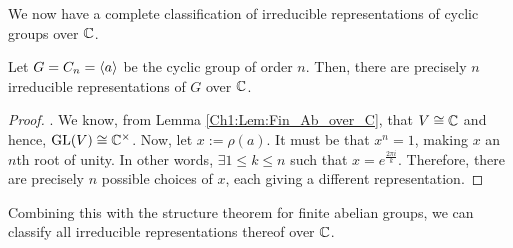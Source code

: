 We now have a complete classification of irreducible representations of cyclic groups over $\mathbb{C}$.

\begin{corollary}\label{Ch1:Cor:Irr_Cycl}
    Let $G = C_n = \left\langle a \right\rangle$ be the cyclic group of order $n$. Then, there are precisely $n$ irreducible representations of $G$ over $\mathbb{C}$.
    \begin{proof}
        . We know, from Lemma \ref{Ch1:Lem:Fin_Ab_over_C}, that $V \cong \mathbb{C}$ and hence, $\operatorname{GL}\!\left( V \right) \cong \mathbb{C}^\times$. Now, let $x := \rho(a)$. It must be that $x^n = 1$, making $x$ an $n$th root of unity. In other words, $\exists 1 \leq k \leq n$ such that $x = e^{\frac{2\pi i}{k}}$. Therefore, there are precisely $n$ possible choices of $x$, each giving a different representation.
    \end{proof}
\end{corollary}

Combining this with the structure theorem for finite abelian groups, we can classify all irreducible representations thereof over $\mathbb{C}$.

